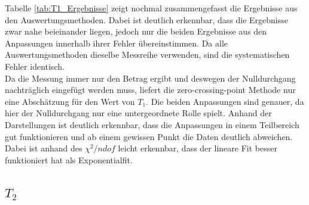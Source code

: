 \documentclass[12pt,a4paper]{article}
\begin{document}
Tabelle \ref{tab:T1_Ergebnisse} zeigt nochmal zusammengefasst die Ergebnisse aus den Auswertungsmethoden. Dabei ist deutlich erkennbar, dass die Ergebnisse zwar nahe beieinander liegen, jedoch nur die beiden Ergebnisse aus den Anpassungen innerhalb ihrer Fehler übereinstimmen. Da alle Auswertungsmethoden dieselbe Messreihe verwenden, sind die systematischen Fehler identisch.\\
Da die Messung immer nur den Betrag ergibt und deswegen der Nulldurchgang nachträglich eingefügt werden muss, liefert die zero-crossing-point Methode nur eine Abschätzung für den Wert von $T_1$. Die beiden Anpassungen sind genauer, da hier der Nulldurchgang nur eine untergeordnete Rolle spielt. Anhand der Darstellungen ist deutlich erkennbar, dass die Anpassungen in einem Teilbereich gut funktionieren und ab einem gewissen Punkt die Daten deutlich abweichen. Dabei ist anhand des $\chi ^2 /ndof$ leicht erkennbar, dass der lineare Fit besser funktioniert hat als Exponentialfit.


\subsection{$T_2$}
\end{document}
